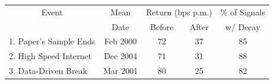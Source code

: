 
\begin{tabular}{lcccc}
\toprule
\multicolumn{1}{c}{Event} & \multicolumn{1}{c}{Mean} & \multicolumn{2}{c}{Return (bps p.m.)} & \multicolumn{1}{c}{\% of Signals} \\  & \multicolumn{1}{c}{Date} & \multicolumn{1}{c}{Before} & \multicolumn{1}{c}{After} & \multicolumn{1}{c}{w/ Decay} \\ 
\midrule
1. Paper's Sample Ends & Feb 2000 & 72 & 37 & 85\\
2. High Speed Internet & Dec 2004 & 71 & 31 & 88\\
3. Data-Driven Break & Mar 2001 & 80 & 25 & 82\\
\bottomrule
\end{tabular}
